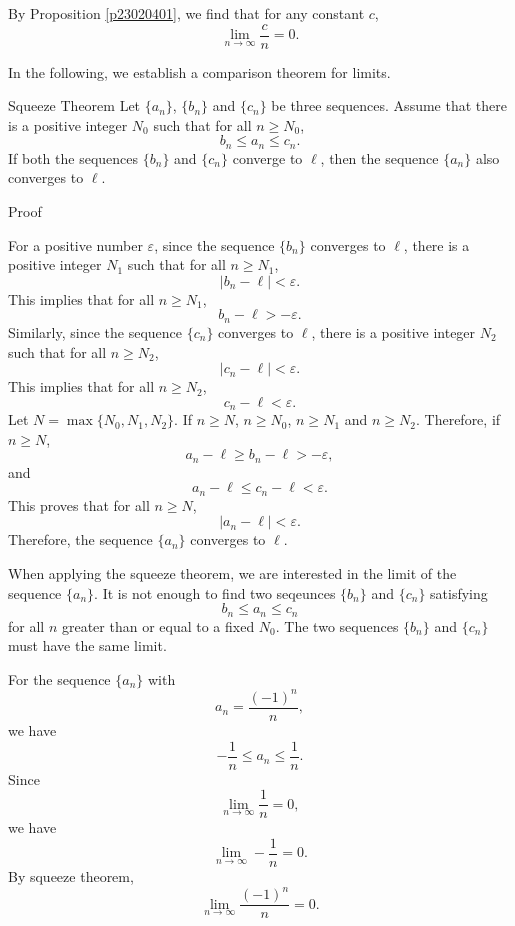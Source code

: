 \begin{example}{}
By Proposition \ref{p23020401}, we find that for any constant $c$,
\[\lim_{n\rightarrow\infty}\frac{c}{n}=0.\]
\end{example}
 


 In the following, we establish a comparison theorem for limits.
\begin{theorem}[label=squeeze]{Squeeze Theorem}
Let $\{a_n\}$, $\{b_n\}$ and $\{c_n\}$ be three sequences. Assume that there is a positive integer $N_0$ such that for all $n\geq N_0$,
\[b_n\leq a_n\leq c_n.\]
If both the sequences $\{b_n\}$ and $\{c_n\}$ converge to $\ell$, then the sequence $\{a_n\}$ also converges to $\ell$.
\end{theorem}

 

\begin{myproof}{ Proof }
 
For a positive number $\varepsilon$, since the sequence $\{b_n\}$ converges to $\ell$, there is a positive integer $N_1$ such that for all $n\geq N_1$, 
\[|b_n-\ell|<\varepsilon.\]
This implies that for all $n\geq   N_1$, 
\[  b_n-\ell>-\varepsilon.\]
Similarly, since the sequence $\{c_n\}$ converges to $\ell$, there is a positive integer $N_2$ such that for all $n\geq N_2$,
\[|c_n-\ell|<\varepsilon.\]
This implies that for all $n\geq N_2$, 
\[c_n-\ell<\varepsilon.\]
Let $N=\max\{N_0, N_1, N_2\}$. If $n\geq N$, $n\geq N_0$, $n\geq N_1$ and $n\geq N_2$. Therefore, if $n\geq N$,
\[a_n-\ell\geq b_n-\ell>-\varepsilon,\]and
\[a_n-\ell\leq c_n-\ell<\varepsilon.\]
This proves that for all $n\geq N$,
\[|a_n-\ell|<\varepsilon.\]Therefore, the sequence $\{a_n\}$ converges to $\ell$.
\end{myproof}


When applying the squeeze theorem, we are interested in the limit of the sequence $\{a_n\}$. It is not enough to find two seqeunces $\{b_n\}$ and $\{c_n\}$ satisfying
\[b_n\leq a_n\leq c_n\] for all $n$ greater than or equal to a fixed $N_0$. The two sequences $\{b_n\}$ and $\{c_n\}$ must have the same limit. 
\begin{example}{}
For the sequence $\{a_n\}$ with
\[a_n=\frac{(-1)^n}{n},\]
we have
\[-\frac{1}{n}\leq a_n\leq \frac{1}{n}.\]
Since
\[\lim_{n\rightarrow\infty}\frac{1}{n}=0,\]we have
\[\lim_{n\rightarrow\infty}-\frac{1}{n}=0.\]
By squeeze theorem, 
\[\lim_{n\rightarrow\infty}\frac{(-1)^n}{n}=0.\]
\end{example}

